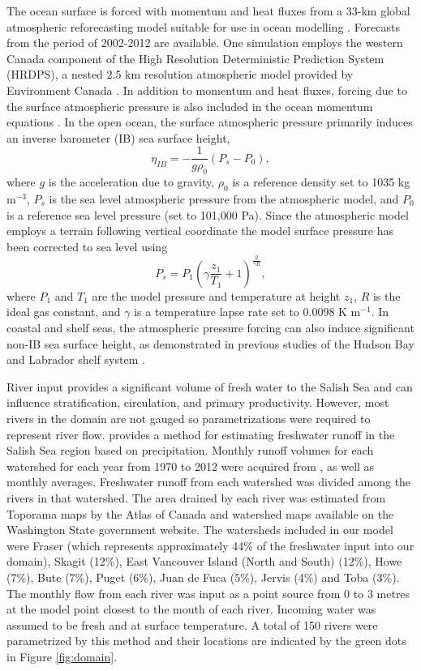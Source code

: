 \documentclass{tATO2e}
\begin{document}
The ocean surface is forced with momentum and heat fluxes from a 33-km global atmospheric reforecasting model suitable for use in ocean modelling \citep{smith2014new}. Forecasts from the period of 2002-2012 are available. One simulation employs the western Canada component of the High Resolution Deterministic Prediction System (HRDPS), a nested 2.5 km resolution atmospheric model provided by Environment Canada \citep{ECModel}. In addition to momentum and heat fluxes, forcing due to the surface atmospheric pressure is also included in the ocean momentum equations \citep{madec2012nemo}. In the open ocean, the surface atmospheric pressure primarily induces an inverse barometer (IB) sea surface height,
\begin{equation}
 \eta_{IB} = -\frac{1}{g\rho_{0}}\left(P_{s}-P_0\right), \label{eq:inverse}
\end{equation}
where $g$ is the acceleration due to gravity, $\rho_{0}$ is a reference density set to 1035 kg m$^{-3}$, $P_{s}$ is the sea level atmospheric pressure from the atmospheric model, and $P_0$ is a reference sea level pressure (set to 101,000 Pa). Since the atmospheric model employs a terrain following vertical coordinate the model surface pressure has been corrected to sea level using \citep{holton1992introduction}
\[ P_s = P_1\left(\gamma\frac{z_1}{T_1} +1 \right)^\frac{g}{\gamma R},\]
where $P_1$ and $T_1$ are the model pressure and temperature at height $z_1$, $R$ is the ideal gas constant, and $\gamma$ is a temperature lapse rate set to 0.0098 K m$^{-1}$. In coastal and shelf seas, the atmospheric pressure forcing can also induce significant non-IB sea surface height, as demonstrated in previous studies of the Hudson Bay and Labrador shelf system \citep{wright1987influence,young1995synoptic}.

River input provides a significant volume of fresh water to the Salish Sea and can influence stratification, circulation, and primary productivity. However, most rivers in the domain are not gauged so parametrizations were required to represent river flow. \citet{morrison2011rivers} provides a method for estimating freshwater runoff in the Salish Sea region based on precipitation. Monthly runoff volumes for each watershed for each year from 1970 to 2012 were acquired from \citet{morrison2011rivers}, as well as monthly averages. Freshwater runoff from each watershed was divided among the rivers in that watershed. The area drained by each river was estimated from Toporama maps by the Atlas of Canada and watershed maps available on the Washington State government website. The watersheds included in our model were Fraser (which represents approximately 44\% of the freshwater input into our domain), Skagit (12\%), East Vancouver Island (North and South) (12\%), Howe (7\%), Bute (7\%), Puget (6\%), Juan de Fuca (5\%), Jervis (4\%) and Toba (3\%). The monthly flow from each river was input as a point source from 0 to 3 metres at the model point closest to the mouth of each river. Incoming water was assumed to be fresh and at surface temperature. A total of 150 rivers were parametrized by this method and their locations are indicated by the green dots in Figure \ref{fig:domain}.
\end{document}
